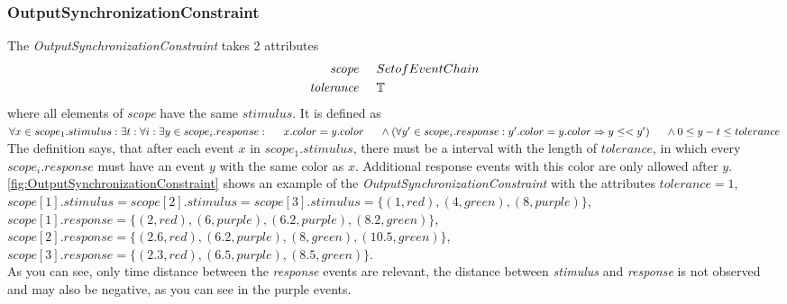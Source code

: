 	\subsubsection{OutputSynchronizationConstraint}
		The \emph{OutputSynchronizationConstraint} takes 2 attributes
		\begin{align*}
			\emph{scope} 	& \hspace{.5cm} Set of EventChain\\
			\emph{tolerance}	& \hspace{.5cm} \mathbb{T}
		\end{align*}
		where all elements of \emph{scope} have the same $stimulus$. It is defined as \\[10pt]
		\begin{math}
			\forall x\in scope_1.stimulus: \exists t: \forall i: \exists y\in scope_i.response:\\
			\text{\hspace{.5cm}} x.color = y.color\\
			\text{\hspace{.5cm}}\land (\forall y'\in scope_i.response: y'.color=y.color \Rightarrow y\leq < y')\\
			\text{\hspace{.5cm}}\land 0\leq y-t\leq tolerance
		\end{math}\\[10pt]
		The definition says, that after each event $x$ in $scope_1.stimulus$, there must be a interval with the length of $tolerance$, in which every $scope_i.response$ must have an event $y$ with the same color as $x$. Additional response events with this color are only allowed after $y$.
		\ref{fig:OutputSynchronizationConstraint} shows an example of the \emph{OutputSynchronizationConstraint} with the attributes $tolerance = 1$,\\
		 $scope[1].stimulus=scope[2].stimulus=scope[3].stimulus=\{(1, red), (4, green), (8, purple)\}$,\\
		$scope[1].response=\{(2, red), (6, purple), (6.2, purple), (8.2, green)\}$,\\
		$scope[2].response=\{(2.6, red), (6.2, purple), (8, green), (10.5, green)\}$,\\
		$scope[3].response=\{(2.3, red), (6.5, purple), (8.5, green)\}$.\\
		As you can see, only time distance between the \emph{response} events are relevant, the distance between \emph{stimulus} and \emph{response} is not observed and may also be negative, as you can see in the purple events.
